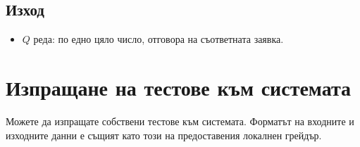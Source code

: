 \documentclass[a4paper,11pt]{article}
\newcommand{\noskip}{\vspace{-\parskip}}
\begin{document}
\subsection*{Изход}
\noskip
\begin{itemize}
    \item $Q$ реда: по едно цяло число, отговора на съответната заявка.
\end{itemize}

\section*{Изпращане на тестове към системата}
Можете да изпращате собствени тестове към системата. Форматът на входните и
изходните данни е същият като този на предоставения локалнен грейдър.
\end{document}
